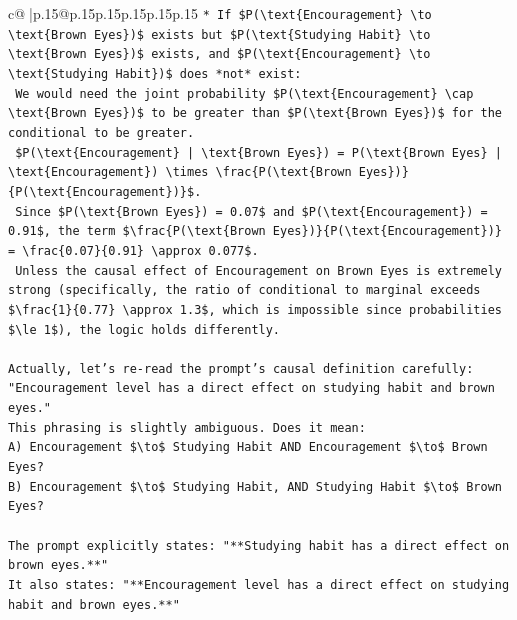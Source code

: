 \documentclass{article}
\begin{document}
{\begin{supertabular}{c@{$\;$}|p{.15\linewidth}@{}p{.15\linewidth}p{.15\linewidth}p{.15\linewidth}p{.15\linewidth}p{.15\linewidth}}
{{{\texttt{*   If \$P(\textbackslash{}text\{Encouragement\} \textbackslash{}to \textbackslash{}text\{Brown Eyes\})\$ exists but \$P(\textbackslash{}text\{Studying Habit\} \textbackslash{}to \textbackslash{}text\{Brown Eyes\})\$ exists, and \$P(\textbackslash{}text\{Encouragement\} \textbackslash{}to \textbackslash{}text\{Studying Habit\})\$ does *not* exist:} \\
\texttt{    We would need the joint probability \$P(\textbackslash{}text\{Encouragement\} \textbackslash{}cap \textbackslash{}text\{Brown Eyes\})\$ to be greater than \$P(\textbackslash{}text\{Brown Eyes\})\$ for the conditional to be greater.} \\
\texttt{    \$P(\textbackslash{}text\{Encouragement\} | \textbackslash{}text\{Brown Eyes\}) = P(\textbackslash{}text\{Brown Eyes\} | \textbackslash{}text\{Encouragement\}) \textbackslash{}times \textbackslash{}frac\{P(\textbackslash{}text\{Brown Eyes\})\}\{P(\textbackslash{}text\{Encouragement\})\}\$.} \\
\texttt{    Since \$P(\textbackslash{}text\{Brown Eyes\}) = 0.07\$ and \$P(\textbackslash{}text\{Encouragement\}) = 0.91\$, the term \$\textbackslash{}frac\{P(\textbackslash{}text\{Brown Eyes\})\}\{P(\textbackslash{}text\{Encouragement\})\} = \textbackslash{}frac\{0.07\}\{0.91\} \textbackslash{}approx 0.077\$.} \\
\texttt{    Unless the causal effect of Encouragement on Brown Eyes is extremely strong (specifically, the ratio of conditional to marginal exceeds \$\textbackslash{}frac\{1\}\{0.77\} \textbackslash{}approx 1.3\$, which is impossible since probabilities \$\textbackslash{}le 1\$), the logic holds differently.} \\
\\ 
\texttt{Actually, let's re{-}read the prompt's causal definition carefully: "Encouragement level has a direct effect on studying habit and brown eyes."} \\
\texttt{This phrasing is slightly ambiguous. Does it mean:} \\
\texttt{A) Encouragement \$\textbackslash{}to\$ Studying Habit AND Encouragement \$\textbackslash{}to\$ Brown Eyes?} \\
\texttt{B) Encouragement \$\textbackslash{}to\$ Studying Habit, AND Studying Habit \$\textbackslash{}to\$ Brown Eyes?} \\
\\ 
\texttt{The prompt explicitly states: "**Studying habit has a direct effect on brown eyes.**"} \\
\texttt{It also states: "**Encouragement level has a direct effect on studying habit and brown eyes.**"} \\
}}}
\end{supertabular}}
\end{document}
